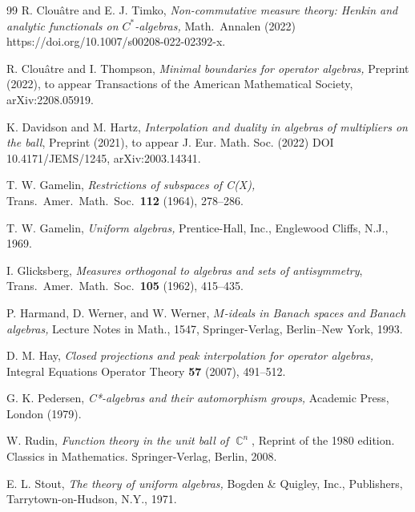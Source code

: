 \documentclass{amsart}
\theoremstyle{remark}
\theoremstyle{definition}
\numberwithin{equation}{section}
\DeclareMathOperator{\Cdb}{{\mathbb C}}
\begin{document}
\begin{thebibliography}{99}
 R.  Clou\^atre and E. J. Timko,  {\em Non-commutative measure theory: Henkin and analytic functionals on $C^*$-algebras,} Math.\ Annalen (2022) 
https://doi.org/10.1007/s00208-022-02392-x.

 R.  Clou\^atre and I. Thompson,  {\em Minimal boundaries for operator algebras,} Preprint (2022), to appear Transactions of the American Mathematical Society, 
arXiv:2208.05919.  

 K. Davidson and M. Hartz, {\em Interpolation and duality in algebras of multipliers on the ball}, Preprint  (2021), to appear J. Eur. Math. Soc. (2022) DOI
10.4171/JEMS/1245, 
arXiv:2003.14341.

 T. W. Gamelin,  {\em 
Restrictions of subspaces of C(X),} 
Trans.\ Amer.\ Math.\ Soc.\  {\bf  112} (1964), 278--286. 

 T. W. Gamelin, {\em Uniform algebras,}  Prentice-Hall, Inc., Englewood Cliffs, N.J., 1969.

 I. Glicksberg, {\em Measures orthogonal to algebras and sets of antisymmetry},
Trans.\ Amer.\ Math.\ Soc.\  {\bf  105} (1962), 415--435. 


  P. Harmand, D. Werner, and W. Werner,
{\em $M$-ideals in Banach spaces and Banach algebras,}
 Lecture Notes in Math.,  1547, Springer-Verlag, Berlin--New York, 1993.
 
  D. M. Hay, {\em Closed projections and peak interpolation for operator algebras,}
  Integral Equations Operator Theory  {\bf 57}  (2007),  491--512.
  
   G. K. Pedersen, {\em C*-algebras and their automorphism
groups,} Academic Press, London (1979).

   W. Rudin, {\em Function theory in the unit ball of $\Cdb^n$}, Reprint of the 1980 edition. Classics in Mathematics. Springer-Verlag, Berlin, 2008.
  
 E. L. Stout,  {\em The theory of uniform algebras,} Bogden \& Quigley, Inc., Publishers, Tarrytown-on-Hudson, N.Y., 1971.

\end{thebibliography}
\end{document}
